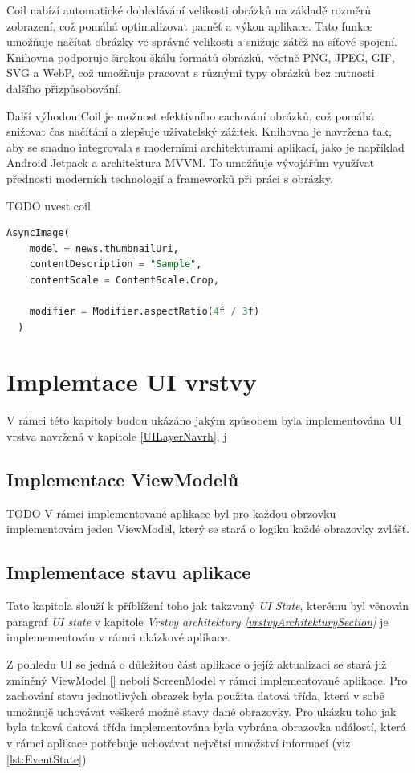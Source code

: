Coil nabízí automatické dohledávání velikosti obrázků na základě rozměrů zobrazení, což pomáhá optimalizovat paměť a výkon aplikace. Tato funkce 
umožňuje načítat obrázky ve správné velikosti a snižuje zátěž na síťové spojení. Knihovna podporuje širokou škálu formátů obrázků, včetně PNG, 
JPEG, GIF, SVG a WebP, což umožňuje pracovat s různými typy obrázků bez nutnosti dalšího přizpůsobování.

Další výhodou Coil je možnost efektivního cachování obrázků, což pomáhá snižovat čas načítání a zlepšuje uživatelský zážitek. Knihovna je navržena tak, 
aby se snadno integrovala s moderními architekturami aplikací, jako je například Android Jetpack a architektura MVVM. To umožňuje vývojářům využívat 
přednosti moderních technologií a frameworků při práci s obrázky.

TODO uvest coil
\begin{lstlisting}[caption={Coil}, label={lst:Coil3}, language=SQL]
  AsyncImage(
    model = news.thumbnailUri,
    contentDescription = "Sample",
    contentScale = ContentScale.Crop,

    modifier = Modifier.aspectRatio(4f / 3f)
  )
\end{lstlisting}

\section{Implemtace UI vrstvy} \label{UILayerImpl}
V rámci této kapitoly budou ukázáno jakým způsobem byla implementována UI vrstva navržená v kapitole \ref{UILayerNavrh}, j

\subsection{Implementace ViewModelů} \label{ViewModelImpl}
TODO %
V rámci implementované aplikace byl pro každou obrzovku implementovám jeden ViewModel, který se stará o logiku každé obrazovky zvlášť. 


\subsection{Implementace stavu aplikace} \label{stateHandlingImpl}
Tato kapitola slouží k příblížení toho jak takzvaný \textit{UI State}, kterému byl věnován paragraf \textit{UI state} v 
kapitole \textit{Vrstvy architektury \ref{vrstvyArchitekturySection} } je implemementován v rámci ukázkové aplikace.

Z pohledu UI se jedná o důležitou část aplikace o jejíž aktualizaci se stará již zmíněný ViewModel \ref{} neboli ScreenModel v rámci
implementované aplikace. 
Pro zachování stavu jednotlivých obrazek byla použita datová třída, která v sobě umožnujě uchovávat veškeré možné stavy dané obrazovky.
Pro ukázku toho jak byla taková datová třída implementována byla vybrána obrazovka událostí, která v rámci aplikace potřebuje 
uchovávat největsí množství informací (viz \ref{lst:EventState})

